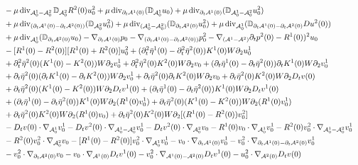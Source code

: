 \documentclass[letterpaper,reqno,10pt,twoside]{amsart}
\theoremstyle{definition}
\theoremstyle{remark}
\def\p{\partial}
\def\dive{\mathop{\rm div}\nolimits}
\begin{document}
\begin{appendix}
\[\begin{aligned}
				&\quad-\mu\dive_{\mathcal{A}^1_0-\mathcal{A}^2_0}\mathbb{D}_{\mathcal{A}^2_0}R^2(0)u^2_0+\mu\dive_{\p_t\mathcal{A}^1(0)}(\mathbb{D}_{\mathcal{A}^1_0}u_0)+\mu\dive_{\p_t\mathcal{A}^1(0)}(\mathbb{D}_{\mathcal{A}^1_0-\mathcal{A}^2_0}u^2_0)\\
				&\quad+\mu\dive_{(\p_t\mathcal{A}^1(0)-\p_t\mathcal{A}^2(0))}(\mathbb{D}_{\mathcal{A}^2_0}u^2_0)+\mu\dive_{(\mathcal{A}^1_0-\mathcal{A}^2_0)}(\mathbb{D}_{\p_t\mathcal{A}^2(0)}u^2_0)+\mu\dive_{\mathcal{A}^1_0}(\mathbb{D}_{\p_t\mathcal{A}^1(0)-\p_t\mathcal{A}^2(0)}Du^2(0))\\
				&\quad+\mu\dive_{\mathcal{A}^1_0}(\mathbb{D}_{\p_t\mathcal{A}^2(0)}u_0)-\nabla_{\p_t\mathcal{A}^1(0)}p_0-\nabla_{(\p_t\mathcal{A}^1(0)-\p_t\mathcal{A}^2(0))}p^2_0-\nabla_{(\mathcal{A}^1-\mathcal{A}^2)}\p_tp^2(0)-R^1(0))^2u_0\\
				&\quad-[R^1(0)-R^2(0)][R^1(0)+R^2(0)]u^2_0+(\p_t^2\bar{\eta}^1(0)-\p_t^2\bar{\eta}^2(0))K^1(0)W\p_2u^1_0\\
				&\quad+\p_t^2\bar{\eta}^2(0)(K^1(0)-K^2(0))W\p_2v^1_0+\p_t^2\bar{\eta}^2(0)K^2(0)W\p_2v_0+(\p_t\bar{\eta}^1(0)-\p_t\bar{\eta}^2(0))\p_tK^1(0)W\p_2v^1_0\\
				&\quad+\p_t\bar{\eta}^2(0)(\p_tK^1(0)-\p_tK^2(0))W\p_2v^1_0+\p_t\bar{\eta}^2(0)\p_tK^2(0)W\p_2v_0+\p_t\bar{\eta}^2(0)K^2(0)W\p_2D_tv(0)\\
				&\quad+\p_t\bar{\eta}^2(0)(K^1(0)-K^2(0))W\p_2D_tv^1(0)+(\p_t\bar{\eta}^1(0)-\p_t\bar{\eta}^2(0))K^1(0)W\p_2D_tv^1(0)\\
				&\quad+(\p_t\bar{\eta}^1(0)-\p_t\bar{\eta}^2(0))K^1(0)W\p_2(R^1(0)v^1_0)+\p_t\bar{\eta}^2(0)(K^1(0)-K^2(0))W\p_2(R^1(0)v^1_0)\\
				&\quad+\p_t\bar{\eta}^2(0)K^2(0)W\p_2(R^1(0)v_0)+\p_t\bar{\eta}^2(0)K^2(0)W\p_2[(R^1(0)-R^2(0))v^2_0]\\
				&\quad-D_tv(0)\cdot\nabla_{\mathcal{A}^1_0}v^1_0- D_tv^2(0)\cdot\nabla_{\mathcal{A}^1_0-\mathcal{A}^2_0}v^1_0-D_tv^2(0)\cdot\nabla_{\mathcal{A}^2_0}v_0-R^1(0)v_0\cdot\nabla_{\mathcal{A}^1_0}v^1_0- R^2(0)v^2_0\cdot\nabla_{\mathcal{A}^1_0-\mathcal{A}^2_0}v^1_0\\
				&\quad-R^2(0)v^2_0\cdot\nabla_{\mathcal{A}^2_0}v_0-[R^1(0)-R^2(0)]v^2_0\cdot\nabla_{\mathcal{A}^1_0}v^1_0-v_0\cdot\nabla_{\p_t\mathcal{A}^1(0)}v^1_0- v^2_0\cdot\nabla_{\p_t\mathcal{A}^1(0)-\p_t\mathcal{A}^2(0)}v^1_0\\
				&\quad-v^2_0\cdot\nabla_{\p_t\mathcal{A}^2(0)}v_0-v_0\cdot\nabla_{\mathcal{A}^1(0)}D_tv^1(0)- v^2_0\cdot\nabla_{\mathcal{A}^1(0)-\mathcal{A}^2(0)}D_tv^1(0)-u^2_0\cdot\nabla_{\mathcal{A}^2(0)}D_tv(0)\\

\end{aligned}\]
\end{appendix}
\end{document}
